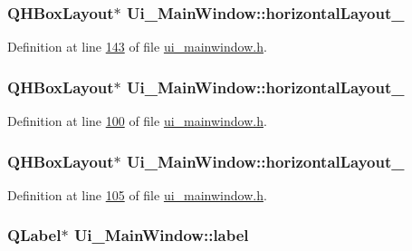 \hypertarget{a00027_a1351e317cba7ca711b6b4d2212b6bf36}{
\subsubsection[{horizontal\+Layout\+\_\+6}]{\setlength{\rightskip}{0pt plus 5cm}Q\+H\+Box\+Layout$\ast$ Ui\+\_\+\+Main\+Window\+::horizontal\+Layout\+\_}}\label{a00027_a1351e317cba7ca711b6b4d2212b6bf36}


Definition at line \hyperlink{a00052_source_l00143}{143} of file \hyperlink{a00052_source}{ui\+\_\+mainwindow.\+h}.

\hypertarget{a00027_a8ead8fc876ee91c30864822eedb9c370}{
\subsubsection[{horizontal\+Layout\+\_\+8}]{\setlength{\rightskip}{0pt plus 5cm}Q\+H\+Box\+Layout$\ast$ Ui\+\_\+\+Main\+Window\+::horizontal\+Layout\+\_}}\label{a00027_a8ead8fc876ee91c30864822eedb9c370}


Definition at line \hyperlink{a00052_source_l00100}{100} of file \hyperlink{a00052_source}{ui\+\_\+mainwindow.\+h}.

\hypertarget{a00027_ab48e49d68609b4c66e5169e2f87e3eb9}{
\subsubsection[{horizontal\+Layout\+\_\+9}]{\setlength{\rightskip}{0pt plus 5cm}Q\+H\+Box\+Layout$\ast$ Ui\+\_\+\+Main\+Window\+::horizontal\+Layout\+\_}}\label{a00027_ab48e49d68609b4c66e5169e2f87e3eb9}


Definition at line \hyperlink{a00052_source_l00105}{105} of file \hyperlink{a00052_source}{ui\+\_\+mainwindow.\+h}.

\hypertarget{a00027_ad9c89133780f28e6efa2ec17ceb9cff5}{
\subsubsection[{label}]{\setlength{\rightskip}{0pt plus 5cm}Q\+Label$\ast$ Ui\+\_\+\+Main\+Window\+::label}}\label{a00027_ad9c89133780f28e6efa2ec17ceb9cff5}


